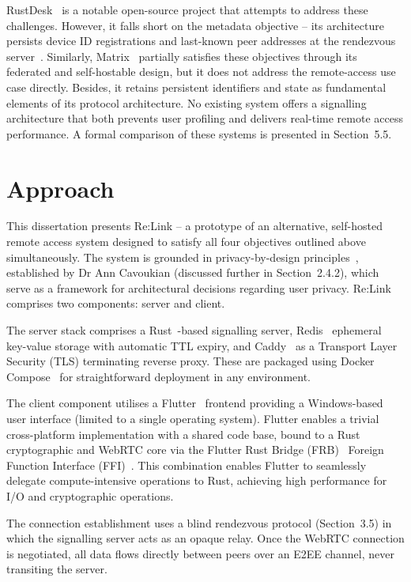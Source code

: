 \documentclass[12pt,a4paper,oneside]{report}
\begin{document}
RustDesk~\cite{rustdesk} is a notable open-source project that attempts to address these challenges. However, it falls short on the metadata objective -- its architecture persists device ID registrations and last-known peer addresses at the rendezvous server~\cite{rustdeskselfhost,flokinetrustdesk}. Similarly, Matrix~\cite{matrix} partially satisfies these objectives through its federated and self-hostable design, but it does not address the remote-access use case directly. Besides, it retains persistent identifiers and state as fundamental elements of its protocol architecture. No existing system offers a signalling architecture that both prevents user profiling and delivers real-time remote access performance. A formal comparison of these systems is presented in Section~5.5.


\section{Approach}
\label{sec:approach}

This dissertation presents Re:Link -- a prototype of an alternative, self-hosted remote access system designed to satisfy all four objectives outlined above simultaneously. The system is grounded in privacy-by-design principles~\cite{cavoukian2011}, established by Dr Ann Cavoukian (discussed further in Section~2.4.2), which serve as a framework for architectural decisions regarding user privacy. Re:Link comprises two components: server and client.

The server stack comprises a Rust~\cite{rustbook}-based signalling server, Redis~\cite{redis} ephemeral key-value storage with automatic TTL expiry, and Caddy~\cite{caddy} as a Transport Layer Security (TLS) terminating reverse proxy. These are packaged using Docker Compose~\cite{docker} for straightforward deployment in any environment.

The client component utilises a Flutter~\cite{flutter} frontend providing a Windows-based user interface (limited to a single operating system). Flutter enables a trivial cross-platform implementation with a shared code base, bound to a Rust cryptographic and WebRTC core via the Flutter Rust Bridge (FRB)~\cite{frb} Foreign Function Interface (FFI)~\cite{flutterffi}. This combination enables Flutter to seamlessly delegate compute-intensive operations to Rust, achieving high performance for I/O and cryptographic operations.

The connection establishment uses a blind rendezvous protocol (Section~3.5) in which the signalling server acts as an opaque relay. Once the WebRTC connection is negotiated, all data flows directly between peers over an E2EE channel, never transiting the server.
\end{document}
